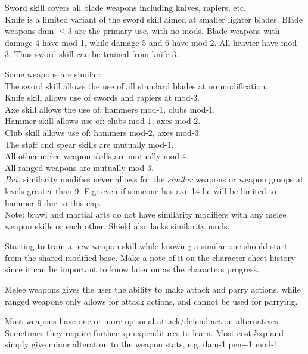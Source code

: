 Sword skill covers all blade weapons including knives, rapiers, etc. \\
Knife is a limited variant of the sword skill aimed at smaller lighter blades. Blade weapons dam $\leq$3 are the primary use, with no mods. Blade weapons with damage 4 have mod-1, while damage 5 and 6 have mod-2. All heavier have mod-3. Thus sword skill can be trained from knife-3.

Some weapons are similar:\\
The sword skill allows the use of all standard blades at no modification.\\
Knife skill allows use of swords and rapiers at mod-3.\\
Axe skill allows the use of: hammers mod-1, clubs mod-1.\\
Hammer skill allows use of: clubs mod-1, axes mod-2.\\
Club skill allows use of: hammers mod-2, axes mod-3.\\
The staff and spear skills are mutually mod-1.\\
All other melee weapon skills are mutually mod-4.\\
All ranged weapons are mutually mod-3.\\
\emph{But:} similarity modifies never allows for the \emph{similar} weapons or weapon groups at levels greater than 9. E.g: even if someone has axe 14 he will be limited to hammer 9 due to this cap.\\
Note: brawl and martial arts do not have similarity modifiers with any melee weapon skills or each other. Shield also lacks similarity mods.


Starting to train a new weapon skill while knowing a similar one should start from the shared modified base. Make a note of it on the character sheet history since it can be important to know later on as the characters progress.

Melee weapons gives the user the ability to make attack and parry actions, while ranged weapons only allows for attack actions, and cannot be used for parrying.

Most weapons have one or more optional attack/defend action alternatives. Sometimes they require further xp expenditures to learn. Most cost 5xp and simply give minor alteration to the weapon stats, e.g. dam-1 pen+1 mod-1.



